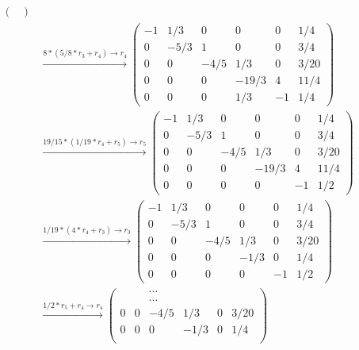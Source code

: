 \begin{enumerate}
\begin{align*}
\begin{pmatrix}
		      \end{pmatrix}                              \\
		       & \overset{8*(5/8*r_3+r_4)\rightarrow r_4}{\longrightarrow }
		      \begin{pmatrix}
			      -1 & 1/3  & 0    & 0     & 0  & 1/4  \\
			      0  & -5/3 & 1    & 0     & 0  & 3/4  \\
			      0  & 0    & -4/5 & 1/3   & 0  & 3/20 \\
			      0  & 0    & 0    & -19/3 & 4  & 11/4 \\
			      0  & 0    & 0    & 1/3   & -1 & 1/4
		      \end{pmatrix}                               \\
		       & \overset{19/15*(1/19*r_4+r_5)\rightarrow r_5}{\longrightarrow }
		      \begin{pmatrix}
			      -1 & 1/3  & 0    & 0     & 0  & 1/4  \\
			      0  & -5/3 & 1    & 0     & 0  & 3/4  \\
			      0  & 0    & -4/5 & 1/3   & 0  & 3/20 \\
			      0  & 0    & 0    & -19/3 & 4  & 11/4 \\
			      0  & 0    & 0    & 0     & -1 & 1/2
		      \end{pmatrix}                               \\
		       & \overset{1/19*(4*r_4+r_3)\rightarrow r_3}{\longrightarrow }
		      \begin{pmatrix}
			      -1 & 1/3  & 0    & 0    & 0  & 1/4  \\
			      0  & -5/3 & 1    & 0    & 0  & 3/4  \\
			      0  & 0    & -4/5 & 1/3  & 0  & 3/20 \\
			      0  & 0    & 0    & -1/3 & 0  & 1/4  \\
			      0  & 0    & 0    & 0    & -1 & 1/2
		      \end{pmatrix}                                \\
		       & \overset{1/2*r_5+r_4\rightarrow r_4}{\longrightarrow }
		      \begin{pmatrix}
			        &   & \cdots &      &           \\
			        &   & \cdots &      &           \\
			      0 & 0 & -4/5   & 1/3  & 0  & 3/20 \\
			      0 & 0 & 0      & -1/3 & 0  & 1/4  \\

\end{pmatrix}
\end{align*}
\end{enumerate}

